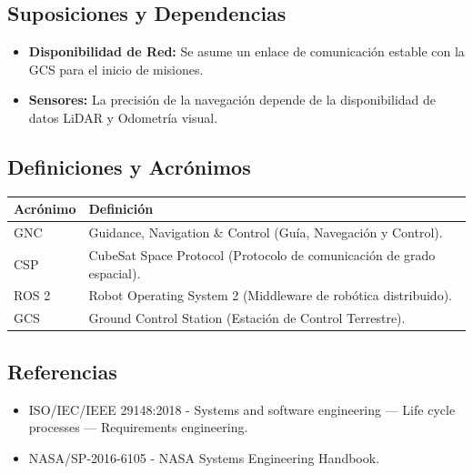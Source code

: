 \subsection{Suposiciones y Dependencias}
\begin{itemize}
    \item \textbf{Disponibilidad de Red:} Se asume un enlace de comunicación estable con la GCS para el inicio de misiones.
    \item \textbf{Sensores:} La precisión de la navegación depende de la disponibilidad de datos LiDAR y Odometría visual.
\end{itemize}

\subsection{Definiciones y Acrónimos}
\begin{table}[H]
    \centering
    \begin{tabularx}{\textwidth}{l X}
        \toprule
        \textbf{Acrónimo} & \textbf{Definición} \\
        \midrule
        GNC & Guidance, Navigation \& Control (Guía, Navegación y Control). \\
        CSP & CubeSat Space Protocol (Protocolo de comunicación de grado espacial). \\
        ROS 2 & Robot Operating System 2 (Middleware de robótica distribuido). \\
        GCS & Ground Control Station (Estación de Control Terrestre). \\
        \bottomrule
    \end{tabularx}
\end{table}

\subsection{Referencias}
\begin{itemize}
    \item ISO/IEC/IEEE 29148:2018 - Systems and software engineering — Life cycle processes — Requirements engineering.
    \item NASA/SP-2016-6105 - NASA Systems Engineering Handbook.
\end{itemize}
